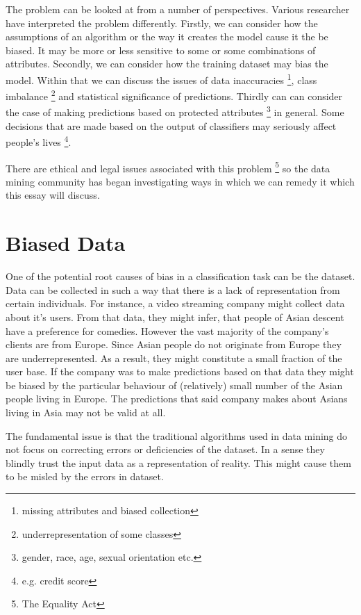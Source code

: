 \documentclass[a4paper, 12pt, titlepage]{article}
\begin{document}
The problem can be looked at from a number of perspectives. Various researcher have interpreted the problem differently. Firstly, we can consider how the assumptions of an algorithm or the way it creates the model cause it the be biased. It may be more or less sensitive to some or some combinations of attributes. Secondly, we can consider how the training dataset may bias the model. Within that we can discuss the issues of data inaccuracies \footnote{missing attributes and biased collection}, class imbalance \footnote{underrepresentation of some classes} and statistical significance of predictions. Thirdly can can consider the case of making predictions based on protected attributes \footnote{gender, race, age, sexual orientation etc.} in general. Some decisions that are made based on the output of classifiers may seriously affect people's lives \footnote{e.g. credit score}. 

There are ethical and legal issues associated with this problem \footnote{The Equality Act} so the data mining community has began investigating ways in which we can remedy it which this essay will discuss.

\section*{Biased Data}

One of the potential root causes of bias in a classification task can be the dataset. Data can be collected in such a way that there is a lack of representation from certain individuals. For instance, a video streaming company might collect data about it's users. From that data, they might infer, that people of Asian descent have a preference for comedies. However the vast majority of the company's clients are from Europe. Since Asian people do not originate from Europe they are underrepresented. As a result, they might constitute a small fraction of the user base. If the company was to make predictions based on that data they might be biased by the particular behaviour of (relatively) small number of the Asian people living in Europe. The predictions that said company makes about Asians living in Asia may not be valid at all.

The fundamental issue is that the traditional algorithms used in data mining do not focus on correcting errors or deficiencies of the dataset. In a sense they blindly trust the input data as a representation of reality. This might cause them to be misled by the errors in dataset.
\end{document}
